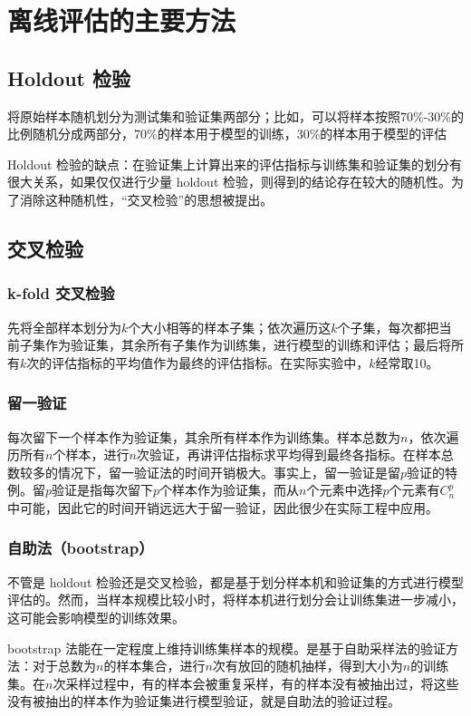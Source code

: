 \documentclass[12pt]{article}
\begin{document}
\section{离线评估的主要方法\cite{Deep_Learning_Recommender_System}}
\subsection{Holdout 检验}
将原始样本随机划分为测试集和验证集两部分；比如，可以将样本按照70\%-30\%的比例随机分成两部分，70\%的样本用于模型的训练，30\%的样本用于模型的评估

Holdout 检验的缺点：在验证集上计算出来的评估指标与训练集和验证集的划分有很大关系，如果仅仅进行少量 holdout 检验，则得到的结论存在较大的随机性。为了消除这种随机性，“交叉检验”的思想被提出。

\subsection{交叉检验}
\subsubsection{k-fold 交叉检验}
先将全部样本划分为$k$个大小相等的样本子集；依次遍历这$k$个子集，每次都把当前子集作为验证集，其余所有子集作为训练集，进行模型的训练和评估；最后将所有$k$次的评估指标的平均值作为最终的评估指标。在实际实验中，$k$经常取10。

\subsubsection{留一验证}
每次留下一个样本作为验证集，其余所有样本作为训练集。样本总数为$n$，依次遍历所有$n$个样本，进行$n$次验证，再讲评估指标求平均得到最终各指标。在样本总数较多的情况下，留一验证法的时间开销极大。事实上，留一验证是留$p$验证的特例。留$p$验证是指每次留下$p$个样本作为验证集，而从$n$个元素中选择$p$个元素有$C_n^p$中可能，因此它的时间开销远远大于留一验证，因此很少在实际工程中应用。

\subsubsection{自助法（bootstrap）}
不管是 holdout 检验还是交叉检验，都是基于划分样本机和验证集的方式进行模型评估的。然而，当样本规模比较小时，将样本机进行划分会让训练集进一步减小，这可能会影响模型的训练效果。

bootstrap 法能在一定程度上维持训练集样本的规模。是基于自助采样法的验证方法：对于总数为$n$的样本集合，进行$n$次有放回的随机抽样，得到大小为$n$的训练集。在$n$次采样过程中，有的样本会被重复采样，有的样本没有被抽出过，将这些没有被抽出的样本作为验证集进行模型验证，就是自助法的验证过程。
\end{document}

